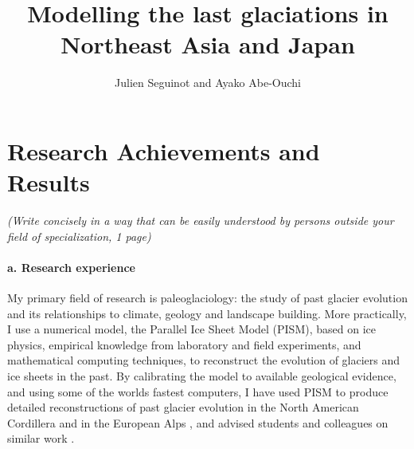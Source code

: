 \documentclass{article}
\title{Modelling the last glaciations in Northeast Asia and Japan}
\author{Julien Seguinot and Ayako Abe-Ouchi}
\begin{document}

\maketitle


\setcounter{section}{15}
\section{Research Achievements and Results}

    \emph{(Write concisely in a way that can be easily understood by persons
          outside your field of specialization, 1 page)}

\paragraph{a. Research experience}

    My primary field of research is paleoglaciology: the study of past
    glacier evolution and its relationships to climate, geology and landscape
    building. More practically, I use a numerical model, the Parallel Ice
    Sheet Model (PISM), based on ice physics, empirical knowledge from
    laboratory and field experiments, and mathematical computing techniques,
    to reconstruct the evolution of glaciers and ice sheets in the past. By
    calibrating the model to available geological evidence, and using some
    of the worlds fastest computers, I have used PISM to produce detailed
    reconstructions of past glacier evolution in the North American Cordillera
    \citep{Seguinot.etal.2014, Seguinot.etal.2016} and in the European Alps
    \citep{Seguinot.etal.2018}, and advised students and colleagues on similar
    work \citep{Becker.etal.2016, Jouvet.etal.2017a, Imhof.etal.2019}.
\end{document}
